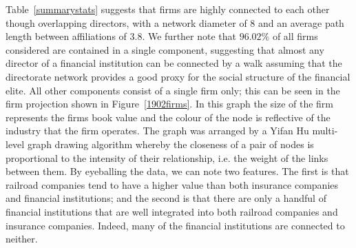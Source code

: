 \documentclass[11pt,fleqn]{article}
\begin{document}
\begin{table}[t]
	\caption{Summary statistics of New York directorate network in 1902.}
	\label{summarystats}
\end{table}

Table~\ref{summarystats} suggests that firms are highly connected to each other though overlapping directors, with a network diameter of $8$ and an average path length between affiliations of $3.8$. We further note that $96.02\%$ of all firms considered are contained in a single component, suggesting that almost any director of a financial institution can be connected by a walk assuming that the directorate network provides a good proxy for the social structure of the financial elite. All other components consist of a single firm only; this can be seen in the firm projection shown in Figure~\ref{1902firms}. In this graph the size of the firm represents the firms book value and the colour of the node is reflective of the industry that the firm operates. The graph was arranged by a Yifan Hu multi-level graph drawing algorithm \citep{Hu2005} whereby the closeness of a pair of nodes is proportional to the intensity of their relationship, i.e. the weight of the links between them. By eyeballing the data, we can note two features. The first is that railroad companies tend to have a higher value than both insurance companies and financial institutions; and the second is that there are only a handful of financial institutions that are well integrated into both railroad companies and insurance companies. Indeed, many of the financial institutions are connected to neither.
\end{document}
